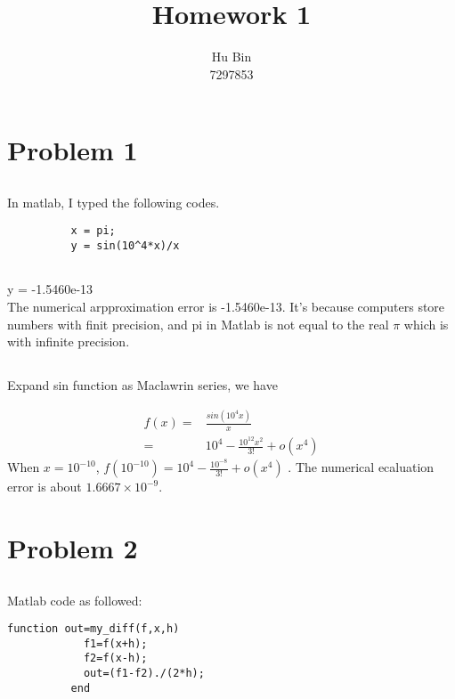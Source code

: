 \documentclass{article}
\title{Homework 1}                   %
\author{Hu Bin\\7297853}
\date{}
\begin{document}
    \maketitle                                  %


    \section{Problem 1}                      %

      \subsection{}                      %
      In matlab, I typed the following codes.\\
        \lstset{language=Matlab}
        \begin{lstlisting}
          x = pi;
          y = sin(10^4*x)/x
        

        \end{lstlisting}
        y = -1.5460e-13\\
        The numerical arpproximation error is -1.5460e-13. It's because computers store numbers with finit precision,
        and pi in Matlab is not equal to the real $\pi$ which is with infinite precision.

        \subsection{}
        Expand sin function as Maclawrin series, we have
    
        \begin{align*}
          f(x) =& \frac{sin(10^4x)}{x}\\
               =& 10^4-\frac{10^{12} x^2}{3!}+o(x^4)
        \end{align*}
        When $x=10^{-10}$, $ f(10^{-10})=10^4-\frac{10^{-8}}{3!}+o(x^4) $ . 
        The numerical ecaluation error is about $1.6667 \times 10^{-9} $.

    \section{Problem 2}
      \subsection{}
        Matlab code as followed:
        \newpage
        \begin{lstlisting}[caption = \mcode{my_diff.m}]
          function out=my_diff(f,x,h)
            f1=f(x+h);
            f2=f(x-h);
            out=(f1-f2)./(2*h);
          end
        \end{lstlisting}
\end{document}
